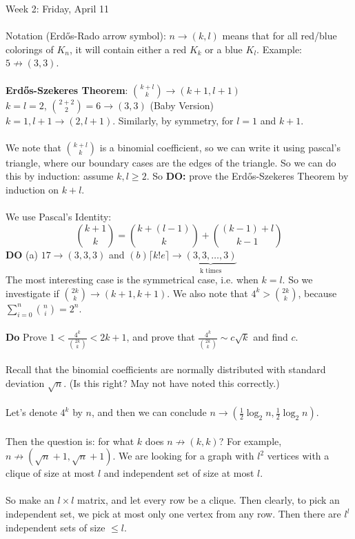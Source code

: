 \documentclass[12pt]{article}
\theoremstyle{remark}
\newcommand*\tund[2]{\underbrace{#1}_\text{#2}}
\begin{document}
\begin{section}{Week 2: Friday, April 11}
\\\\Notation (Erd\H{o}s-Rado arrow symbol): $n \to (k,l)$ means that for all red/blue colorings of $K_n$, it will contain either a red $K_k$ or a blue $K_l$. Example: $5 \not\to (3,3)$.
\\\\\textbf{Erd\H{o}s-Szekeres Theorem}: ${k+l \choose k} \to (k+1,l+1)$
\\$k=l=2$, ${2+2 \choose 2} = 6 \to (3,3)$ (Baby Version)
\\$k=1, l+1 \to (2,l+1)$. Similarly, by symmetry, for $l=1$ and $k+1$. 
\\\\We note that ${k+l \choose k}$ is a binomial coefficient, so we can write it using pascal's triangle, where our boundary cases are the edges of the triangle. So we can do this by induction: assume $k,l \geq 2$. So \textbf{DO:} prove the Erd\H{o}s-Szekeres Theorem by induction on $k+l$.
\\\\We use Pascal's Identity: 
$${k+1 \choose k}
 = {k+(l-1) \choose k}
  + {(k-1)+l \choose k-1}$$
  \textbf{DO} (a) $17 \to (3,3,3)$ and $(b) \lceil k! e \rceil \to \tund{(3,3,\ldots,3)}{k times}$
\\The most interesting case is the symmetrical case, i.e. when $k=l$. So we investigate if ${ 2k \choose k} \to (k+1,k+1)$. We also note that $4^k > {2k \choose k}$, because  $\sum^{n}_{i=0} {n \choose i} = 2^n$.
\\\\
\textbf{Do} Prove $1 < \frac{4^k}{{2k \choose k}} < 2k+1$, and prove that $\frac{4^k}{{2k \choose k}} \sim c\sqrt{k}$ and find $c$. 
\\\\Recall that the binomial coefficients are normally distributed with standard deviation $\sqrt{n}$. (Is this right? May not have noted this correctly.)
\\\\Let's denote $4^k$ by $n$, and then we can conclude $n \to (\frac 12 \log_2 n, \frac 12 \log_2 n)$.
\\\\Then the question is: for what $k$ does $n \not \to (k,k)$? For example, $n \not \to ( \sqrt{n} +1,\sqrt{n}+1)$. We are looking for a graph with $l^2$ vertices with a clique of size at most $l$ and independent set of size at most $l$.
\\\\So make an $l \times l$ matrix, and let every row be a clique. Then clearly, to pick an independent set, we pick at most only one vertex from any row. Then there are $l^l$ independent sets of size $\leq l$.

\end{section}
\end{document}
